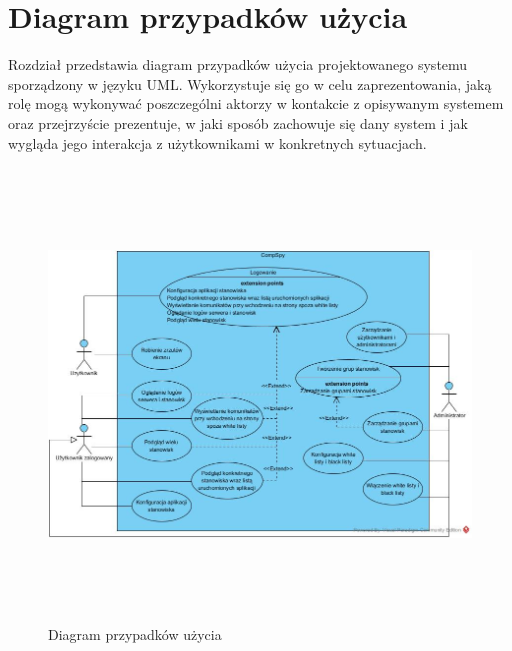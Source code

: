 \section{Diagram przypadków użycia}

Rozdział przedstawia diagram przypadków użycia projektowanego systemu sporządzony w języku UML. Wykorzystuje się go w celu zaprezentowania, jaką rolę mogą wykonywać poszczególni aktorzy w kontakcie z opisywanym systemem oraz przejrzyście prezentuje, w jaki sposób zachowuje się dany system i jak wygląda jego interakcja z użytkownikami w konkretnych sytuacjach.

\newline
\begin{figure} [!ht]
    \centering
    \includegraphics[height=12cm,width=15cm]{PT_UC_Diagram}
    \caption{Diagram przypadków użycia}
    \label{fig:my_label}
\end{figure}
